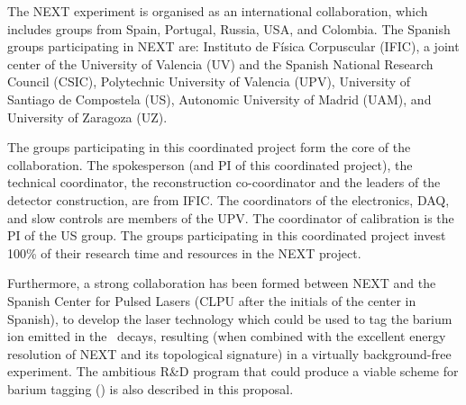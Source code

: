 The NEXT experiment is organised as an international collaboration, which includes groups from Spain, Portugal, Russia, USA, and Colombia. The Spanish groups participating in NEXT are: Instituto de Física Corpuscular (IFIC), a joint center of the University of Valencia (UV) and the Spanish National Research Council (CSIC), Polytechnic University of Valencia (UPV), University of Santiago de Compostela (US), Autonomic University of Madrid (UAM), and University of Zaragoza (UZ). 

The groups participating in this coordinated project form the core of the collaboration. The spokesperson (and PI of this coordinated project), the technical coordinator, the reconstruction co-coordinator and the leaders of the detector construction, are from IFIC. The coordinators of the electronics, DAQ, and slow controls are members of the UPV. The coordinator of calibration is the PI  of the US group. The groups participating in this coordinated project invest 100\% of their research time and resources in the NEXT project. 

Furthermore, a strong collaboration has been  formed between NEXT and the Spanish Center for Pulsed Lasers (CLPU after the initials of the center in Spanish), to develop the laser technology which could be used to tag the barium ion emitted in the \bb\ decays, resulting (when combined with the excellent energy resolution of NEXT and its topological signature) in a virtually background-free experiment. The ambitious R\&D program that could produce a viable scheme for barium tagging (\BATA) is also described in this proposal.  

%


